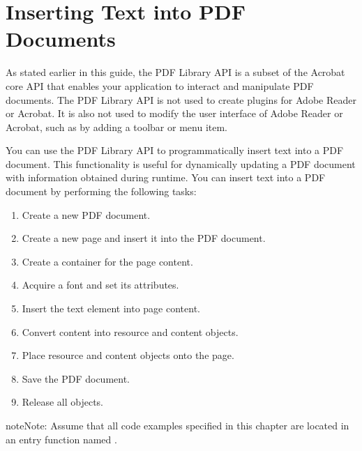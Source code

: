 \documentclass[letterpaper,12pt,english,openany,oneside]{sphinxmanual}
\begin{document}
\chapter{Inserting Text into PDF Documents}
\label{\detokenize{Plugins_Insertext:inserting-text-into-pdf-documents}}\label{\detokenize{Plugins_Insertext::doc}}
As stated earlier in this guide, the PDF Library API is a subset of the Acrobat core API that enables your application to interact and manipulate PDF documents. The PDF Library API is not used to create plugins for Adobe Reader or Acrobat. It is also not used to modify the user interface of Adobe Reader or Acrobat, such as by adding a toolbar or menu item.

You can use the PDF Library API to programmatically insert text into a PDF document. This functionality is useful for dynamically updating a PDF document with information obtained during run\sphinxhyphen{}time. You can insert text into a PDF document by performing the following tasks:
\begin{enumerate}
%
\item {} 
Create a new PDF document.

\item {} 
Create a new page and insert it into the PDF document.

\item {} 
Create a container for the page content.

\item {} 
Acquire a font and set its attributes.

\item {} 
Insert the text element into page content.

\item {} 
Convert content into resource and content objects.

\item {} 
Place resource and content objects onto the page.

\item {} 
Save the PDF document.

\item {} 
Release all objects.

\end{enumerate}

\begin{sphinxadmonition}{note}{Note:}
Assume that all code examples specified in this chapter are located in an entry function named .
\end{sphinxadmonition}
\end{document}
